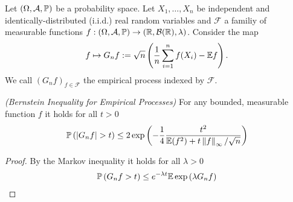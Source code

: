 
Let 
$
  \left( 
    \Omega,
    \mathcal{A},
    \P
  \right)
$
be a probability space.
Let 
$X_1, \ldots, X_n$ be independent and identically-distributed (i.i.d.)
real random variables
and $\mathcal{F}$ a familiy of measurable functions
$
  f:
  \left( 
    \Omega,
    \mathcal{A},
    \P
  \right)
    \to
  \left( 
    \R,
    \mathcal{B}(\R),
    \lambda
  \right)
$.
Consider the map
\begin{gather}
  f
  \mapsto
  G_n f
  :=
  \sqrt{n}
  \left( 
    \frac{1}{n}
    \sum_{i = 1}^{n}
      f(X_i)
    -
    \E f
  \right).
\end{gather}
We call 
$
  \left( 
    G_n f
  \right)_{f \in \mathcal{F}}
$
the empirical process indexed by $\mathcal{F}$.

\begin{lemma}
  \emph{(Bernstein Inequality for Empirical Processes)}
  For any bounded, measurable function $f$
  it holds for all $t > 0$
  \begin{gather}
    \P 
    \left(
      \left| 
        G_n f
      \right|
      >
      t
    \right)
    \le
    2
    \exp
    \left( 
      - \frac{1}{4}
      \frac{t^2}
      {
        \E(f^2)
        +
        t
        \norm{f}_\infty
        /
        \sqrt{n}
      }
    \right)
  \end{gather}
\end{lemma}
\begin{proof}
  By the Markov inequality it holds for all $\lambda > 0$
  \begin{gather}
    \P
    \left( 
      G_n f 
      > 
      t
    \right)
    \le
    e^{-\lambda t}
    \E
    \exp
    \left( 
      \lambda
      G_n f 
    \right)
  \end{gather}
\end{proof}

